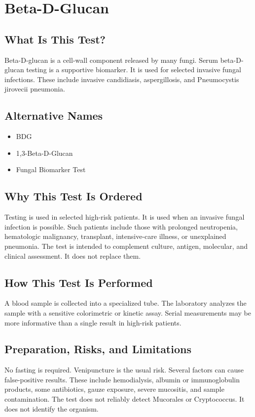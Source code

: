 \chapter{Beta-D-Glucan}

\section*{What Is This Test?}
Beta-D-glucan is a cell-wall component released by many fungi.
Serum beta-D-glucan testing is a supportive biomarker.
It is used for selected invasive fungal infections.
These include invasive candidiasis, aspergillosis, and Pneumocystis jirovecii pneumonia.

\section*{Alternative Names}
\begin{itemize}
  \item BDG
  \item 1,3-Beta-D-Glucan
  \item Fungal Biomarker Test
\end{itemize}
\section*{Why This Test Is Ordered}
Testing is used in selected high-risk patients.
It is used when an invasive fungal infection is possible.
Such patients include those with prolonged neutropenia, hematologic malignancy, transplant, intensive-care illness, or unexplained pneumonia.
The test is intended to complement culture, antigen, molecular, and clinical assessment.
It does not replace them.

\section*{How This Test Is Performed}
A blood sample is collected into a specialized tube.
The laboratory analyzes the sample with a sensitive colorimetric or kinetic assay.
Serial measurements may be more informative than a single result in high-risk patients.

\section*{Preparation, Risks, and Limitations}
No fasting is required.
Venipuncture is the usual risk.
Several factors can cause false-positive results.
These include hemodialysis, albumin or immunoglobulin products, some antibiotics, gauze exposure, severe mucositis, and sample contamination.
The test does not reliably detect Mucorales or Cryptococcus.
It does not identify the organism.

